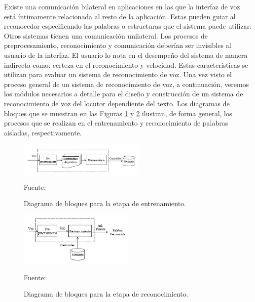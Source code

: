 Existe una comunicación bilateral en aplicaciones en las que la interfaz de voz está íntimamente relacionada al resto de la aplicación. Estas pueden guiar al reconocedor especificando las palabras o estructuras que el sistema puede utilizar. Otros sistemas tienen una comunicación unilateral.
\vskip 0.5cm
Los procesos de preprocesamiento, reconocimiento y comunicación deberían ser invisibles al usuario de la interfaz. El usuario lo nota en el desempeño del sistema de manera indirecta como: certeza en el reconocimiento y velocidad. Estas características se utilizan para evaluar un sistema de reconocimiento de voz.
\vskip 0.5cm
Una vez visto el proceso general de un sistema de reconocimiento de voz, a continuación, veremos los módulos necesarios a detalle para el diseño y construcción de un sistema de reconocimiento de voz del locutor dependiente del texto. 
\vskip 0.5cm
Los diagramas de bloques que se muestran en las Figuras \ref{fig:figura2.5} y \ref{fig:figura2.6} ilustran, de forma general, los procesos que se realizan en el entrenamiento y reconocimiento de palabras aisladas, respectivamente.

\begin{figure}[ht]
\begin{center}
\includegraphics[width=0.55\textwidth]{Imagenes/Cap2/image005}
\end{center}
\begin{center}
\vskip -0.5cm
\caption{\small{Diagrama de bloques para la etapa de entrenamiento.}}
\label{fig:figura2.5}
{\small{Fuente: \cite{navarrete}}}
\end{center}
\end{figure}

\begin{figure}[ht]
\begin{center}
\includegraphics[width=0.5\textwidth]{Imagenes/Cap2/image006}
\end{center}
\begin{center}
\vskip -0.5cm
\caption{\small{Diagrama de bloques para la etapa de reconocimiento.}}
\label{fig:figura2.6}
{\small{Fuente: \cite{navarrete}}}
\end{center}
\end{figure}

